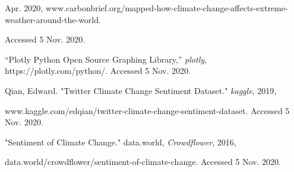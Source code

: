 \documentclass[fontsize=11pt]{article}
\begin{document}
\begin{flushleft}
\smallskip

 Apr. 2020, www.carbonbrief.org/mapped-how-climate-change-affects-extreme-weather-around-the-world. 

\smallskip

\qquad Accessed 5 Nov. 2020.

\vspace{0.3 cm}


“Plotly Python Open Source Graphing Library,” \textit{plotly}, https://plotly.com/python/. Accessed 5 Nov. 2020.

\vspace{0.3 cm}


Qian, Edward. "Twitter Climate Change Sentiment Dataset." \textit{kaggle}, 2019, 

\smallskip

\qquad www.kaggle.com/edqian/twitter-climate-change-sentiment-dataset. Accessed 5 Nov. 2020.

\vspace{0.3 cm}

"Sentiment of Climate Change." data.world, \textit{Crowdflower}, 2016, 

\smallskip

\qquad data.world/crowdflower/sentiment-of-climate-change. Accessed 5 Nov. 2020.

\end{flushleft}


\end{document}
